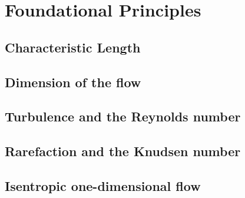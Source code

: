 \section{Foundational Principles}


\subsection{Characteristic Length}  


\subsection{Dimension of the flow}


\subsection{Turbulence and the Reynolds number}


\subsection{Rarefaction and the Knudsen number}


\subsection{Isentropic one-dimensional flow}



